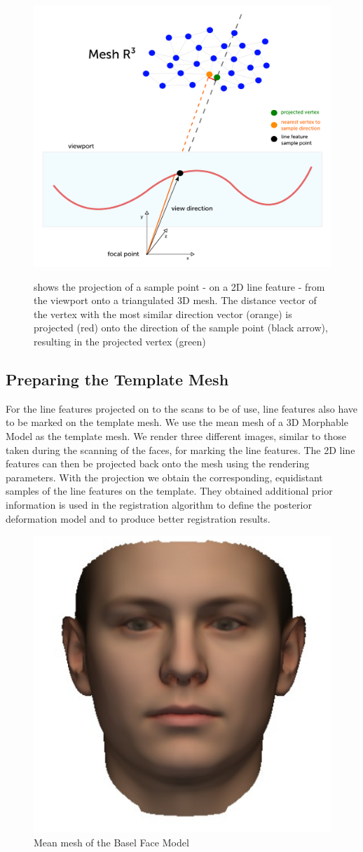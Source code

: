 \begin{figure}[h!]
    \includegraphics[width=\textwidth]{./resources/figures/projection.pdf}
\label{fig:projection}
\caption{shows the projection of a sample point - on a 2D line feature - from the viewport onto a triangulated 3D mesh. The distance vector of the vertex with the most similar direction vector (orange) is projected (red) onto the direction of the sample point (black arrow), resulting in the projected vertex (green)}
\end{figure}
\subsection{Preparing the Template Mesh}
For the line features projected on to the scans to be of use, line features also have to be marked on the template mesh. We use the mean mesh of a 3D Morphable Model \cite{bfm} as the template mesh. We render three different images, similar to those taken during the scanning of the faces, for marking the line features. The 2D line features can then be projected back onto the mesh using the rendering parameters. With the projection we obtain the corresponding, equidistant samples of the line features on the template. They obtained additional prior information is used in the registration algorithm to define the posterior deformation model and to produce better registration results.
\begin{figure}[h!]
    \centering
    \includegraphics[width=.3\textwidth]{./resources/img/mean_msh.pdf}
    \caption{Mean mesh of the Basel Face Model}
\end{figure}

